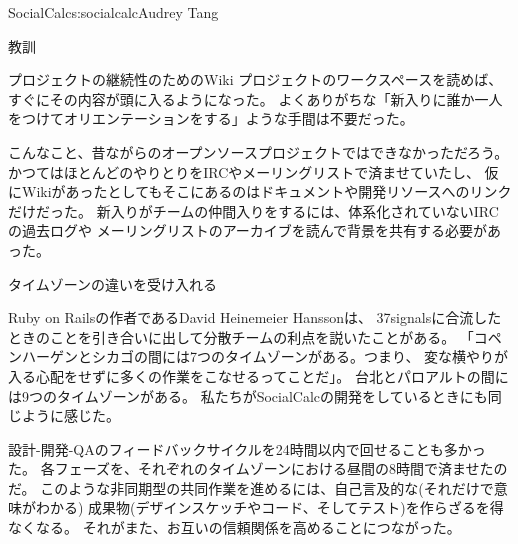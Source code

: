 \begin{aosachapter}{SocialCalc}{s:socialcalc}{Audrey Tang}
\begin{aosasect1}{教訓}
\begin{aosasect2}{プロジェクトの継続性のためのWiki}
プロジェクトのワークスペースを読めば、すぐにその内容が頭に入るようになった。
よくありがちな「新入りに誰か一人をつけてオリエンテーションをする」ような手間は不要だった。

こんなこと、昔ながらのオープンソースプロジェクトではできなかっただろう。
かつてはほとんどのやりとりをIRCやメーリングリストで済ませていたし、
仮にWikiがあったとしてもそこにあるのはドキュメントや開発リソースへのリンクだけだった。
新入りがチームの仲間入りをするには、体系化されていないIRCの過去ログや
メーリングリストのアーカイブを読んで背景を共有する必要があった。

\end{aosasect2}

\begin{aosasect2}{タイムゾーンの違いを受け入れる}

Ruby on Railsの作者であるDavid Heinemeier Hanssonは、
37signalsに合流したときのことを引き合いに出して分散チームの利点を説いたことがある。
「コペンハーゲンとシカゴの間には7つのタイムゾーンがある。つまり、
変な横やりが入る心配をせずに多くの作業をこなせるってことだ」。
台北とパロアルトの間には9つのタイムゾーンがある。
私たちがSocialCalcの開発をしているときにも同じように感じた。

設計-開発-QAのフィードバックサイクルを24時間以内で回せることも多かった。
各フェーズを、それぞれのタイムゾーンにおける昼間の8時間で済ませたのだ。
このような非同期型の共同作業を進めるには、自己言及的な(それだけで意味がわかる)
成果物(デザインスケッチやコード、そしてテスト)を作らざるを得なくなる。
それがまた、お互いの信頼関係を高めることにつながった。


\end{aosasect2}
\end{aosasect1}
\end{aosachapter}
